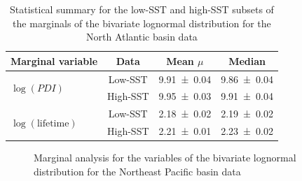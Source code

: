 \vspace{-5pt}
\begin{table}[H]
	\centering
	\begin{tabular}{lccc}
		\toprule
		\toprule
		Marginal variable & Data & Mean $\mu$            & Median \\
		\midrule
		\multirow{2}{*}{$\log(PDI)$}
		 & Low-SST               & \num{9.91 \pm 0.04} & \num{9.86 \pm 0.04} \\
		 & High-SST              & \num{9.95 \pm 0.03} & \num{9.91 \pm 0.04} \\
		\midrule
		\multirow{2}{*}{$\log(\text{lifetime})$}
		 & Low-SST               & \num{2.18 \pm 0.02} & \num{2.19 \pm 0.02} \\
		 & High-SST              & \num{2.21 \pm 0.01} & \num{2.23 \pm 0.02} \\
		\bottomrule
	\end{tabular}
	\caption{Statistical summary for the low-SST and high-SST subsets of the marginals of the bivariate lognormal distribution for the North Atlantic basin data}
	\label{tab:natl-marginals-stats}
\end{table}

\vspace{-5pt}
\begin{figure}[H]
	\centering
	\caption{Marginal analysis for the variables of the bivariate lognormal distribution for the Northeast Pacific basin data}
	\label{fig:epac-marginals}
\end{figure}



